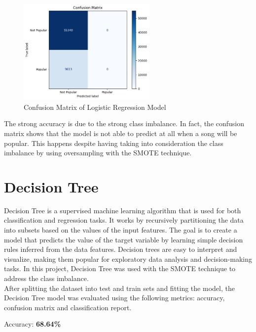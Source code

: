 \begin{figure}[h] 
    \centering 
    \includegraphics[width=0.6\textwidth]{media/log_reg_confusionmatrix.png}
    \caption{Confusion Matrix of Logistic Regression Model}

\end{figure}

The strong accuracy is due to the strong class imbalance. In fact, the confusion matrix shows that the model is not able to predict at all when a song will be popular. This happens despite having taking into consideration the class imbalance by using oversampling with the SMOTE technique.



\newpage

\section{Decision Tree}

Decision Tree is a supervised machine learning algorithm that is used for both classification and regression tasks. It works by recursively partitioning the data into subsets based on the values of the input features. The goal is to create a model that predicts the value of the target variable by learning simple decision rules inferred from the data features. Decision trees are easy to interpret and visualize, making them popular for exploratory data analysis and decision-making tasks. In this project, Decision Tree was used with the SMOTE technique to address the class imbalance. \\

After splitting the dataset into test and train sets and fitting the model, the Decision Tree model was evaluated using the following metrics: accuracy, confusion matrix and classification report.


Accuracy: \textbf{68.64\%}


